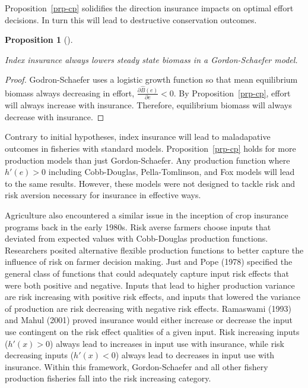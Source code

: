 \documentclass[
  letterpaper,
  DIV=11,
  numbers=noendperiod]{scrartcl}
\theoremstyle{plain}
\theoremstyle{plain}
\newtheorem{proposition}{Proposition}[section]
\theoremstyle{remark}
\begin{document}
Proposition~\ref{prp-cp} solidifies the direction insurance impacts on
optimal effort decisions. In turn this will lead to destructive
conservation outcomes.

\begin{proposition}[]\protect\hypertarget{prp-synas}{}\label{prp-synas}

Index insurance always lowers steady state biomass in a Gordon-Schaefer
model.

\end{proposition}

\begin{proof}

Godron-Schaefer uses a logistic growth function so that mean equilibrium
biomass always decreasing in effort,
\(\frac{\partial\hat{B}(e)}{\partial e}<0\). By
Proposition~\ref{prp-cp}, effort will always increase with insurance.
Therefore, equilibrium biomass will always decrease with insurance.

\end{proof}

Contrary to initial hypotheses, index insurance will lead to
maladapative outcomes in fisheries with standard models.
Proposition~\ref{prp-cp} holds for more production models than just
Gordon-Schaefer. Any production function where \(h'(e)>0\) including
Cobb-Douglas, Pella-Tomlinson, and Fox models will lead to the same
results. However, these models were not designed to tackle risk and risk
aversion necessary for insurance in effective ways.

Agriculture also encountered a similar issue in the inception of crop
insurance programs back in the early 1980s. Risk averse farmers choose
inputs that deviated from expected values with Cobb-Douglas production
functions. Researchers posited alternative flexible production functions
to better capture the influence of risk on farmer decision making. Just
and Pope (1978) specified the general class of functions that could
adequately capture input risk effects that were both positive and
negative. Inputs that lead to higher production variance are risk
increasing with positive risk effects, and inputs that lowered the
variance of production are risk decreasing with negative risk effects.
Ramaswami (1993) and Mahul (2001) proved insurance would either increase
or decrease the input use contingent on the risk effect qualities of a
given input. Risk increasing inputs (\(h'(x)>0\)) always lead to
increases in input use with insurance, while risk decreasing inputs
(\(h'(x)<0\)) always lead to decreases in input use with insurance.
Within this framework, Gordon-Schaefer and all other fishery production
fisheries fall into the risk increasing category.
\end{document}
